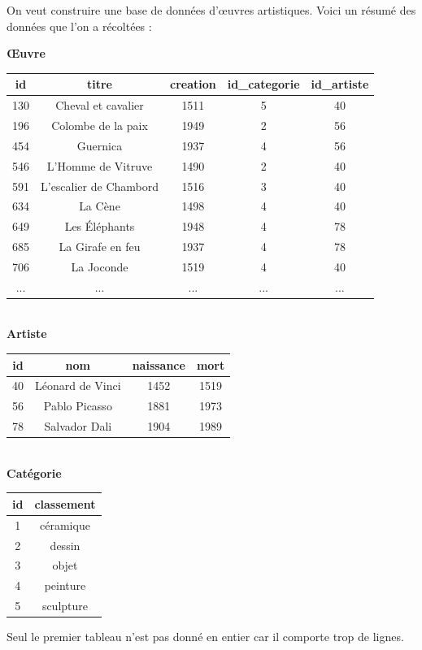 \documentclass[a4paper,10pt]{article}
\begin{document}
On veut construire une base de données d'\oe uvres artistiques. Voici un résumé des données que l'on a récoltées :
\begin{center}
\textbf{Œuvre}\\[1em]

\begin{tabular}{|c|c|c|c|c|}
\hline
\rowcolor{UGLiOrange} \textbf{\color{white}id} &\textbf{\color{white}titre}&\textbf{\color{white}creation}&\textbf{\color{white}id\_categorie}&\textbf{\color{white}id\_artiste}\\
\hline
130&Cheval et cavalier &1511 &5 &40\\
196&Colombe de la paix &1949 &2 &56\\
454&Guernica &1937&4&56\\
546&L'Homme de Vitruve&1490&2&40\\
591&L'escalier de Chambord&1516&3&40\\
634&La Cène&1498&4&40\\
649&Les Éléphants&1948&4&78\\
685&La Girafe en feu&1937&4&78\\
706&La Joconde&1519&4&40\\
...&... & ... & ... & ...\\
\hline
\end{tabular}\\[2em]

\textbf{Artiste}\\[1em]

\begin{tabular}{|c|c|c|c|}
\hline
\rowcolor{UGLiOrange} \textbf{\color{white}id} &\textbf{\color{white}nom}&\textbf{\color{white}naissance}&\textbf{\color{white}mort}\\
\hline
40 & Léonard de Vinci & 1452 & 1519\\
56 & Pablo Picasso & 1881 & 1973 \\
78 & Salvador Dali & 1904 & 1989\\
\hline
\end{tabular}\\[2em]

\textbf{Catégorie}\\[1em]

\begin{tabular}{|c|c|}
\hline
\rowcolor{UGLiOrange} \textbf{\color{white}id} &\textbf{\color{white}classement}\\
\hline
1 & céramique \\
2 & dessin \\
3 & objet \\
4 & peinture \\
5 & sculpture \\
\hline
\end{tabular}
\end{center}
Seul le premier tableau n'est pas donné en entier car il comporte trop de lignes.
\end{document}
